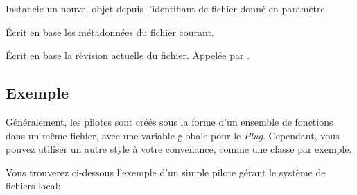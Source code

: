 \documentclass[letterpaper,10pt,english]{sphinxmanual}
\begin{document}
\begin{fulllineitems}
\begin{fulllineitems}
\end{fulllineitems}


\begin{fulllineitems}
\label{drivers:onitu.api.metadata.Metadata.get_by_id}
Instancie un nouvel objet {\hyperref[drivers:onitu.api.metadata.Metadata]{}} depuis l'identifiant de fichier donné en paramètre.

\end{fulllineitems}


\begin{fulllineitems}
\label{drivers:onitu.api.metadata.Metadata.write}
Écrit en base les métadonnées du fichier courant.

\end{fulllineitems}


\begin{fulllineitems}
\label{drivers:onitu.api.metadata.Metadata.write_revision}
Écrit en base la révision actuelle du fichier. Appelée par {\hyperref[drivers:onitu.api.metadata.Metadata.write]{}}.

\end{fulllineitems}


\end{fulllineitems}



\subsection{Exemple}
\label{drivers:example}
Généralement, les pilotes sont créés sous la forme d'un ensemble de fonctions dans un même fichier, avec une variable globale pour le \emph{Plug}. Cependant, vous pouvez utiliser un autre style à votre convenance, comme une classe par exemple.

Vous trouverez ci-dessous l'exemple d'un simple pilote gérant le système de fichiers local:
\end{document}
